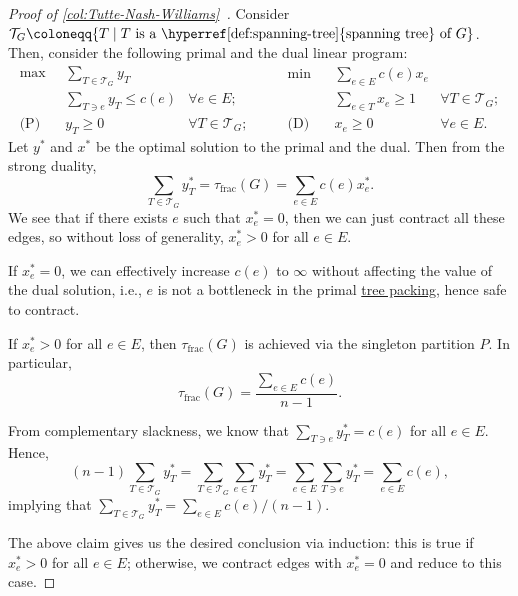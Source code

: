 \begin{proof}[Proof of \autoref{col:Tutte-Nash-Williams}~\cite{chekuri2017near}]\label{pf:col:Tutte-Nash-Williams}
	Consider \(\mathcal{T} _G \coloneqq \{ T \mid T \text{ is a \hyperref[def:spanning-tree]{spanning tree} of } G \} \). Then, consider the following primal and the dual linear program:
	\[
		\begin{aligned}
			\max~           & \sum_{T \in \mathcal{T} _G} y_T                                 \\
			                & \sum_{T \ni e} y_T \leq c(e)    & \forall e \in E;              \\
			\text{(P)}\quad & y_T \geq 0                      & \forall T \in \mathcal{T} _G;
		\end{aligned}\qquad
		\begin{aligned}
			\min~           & \sum_{e \in E} c(e) x_e                                   \\
			                & \sum_{e \in T} x_e \geq 1 & \forall T \in \mathcal{T} _G; \\
			\text{(D)}\quad & x_e \geq 0                & \forall e \in E.
		\end{aligned}
	\]
	Let \(y^{\ast} \) and \(x^{\ast} \) be the optimal solution to the primal and the dual. Then from the strong duality,
	\[
		\sum_{T \in \mathcal{T} _G} y^{\ast} _T
		= \tau _{\text{frac} }(G)
		= \sum_{e \in E} c(e) x^{\ast} _e.
	\]
	We see that if there exists \(e\) such that \(x^{\ast} _e = 0\), then we can just contract all these edges, so without loss of generality, \(x^{\ast} _e > 0\) for all \(e \in E\).

	\begin{intuition}
		If \(x^{\ast} _e = 0\), we can effectively increase \(c(e)\) to \(\infty \) without affecting the value of the dual solution, i.e., \(e\) is not a bottleneck in the primal \hyperref[prb:TP]{tree packing}, hence safe to contract.
	\end{intuition}

	\begin{claim}
		If \(x^{\ast} _e > 0\) for all \(e \in E\), then \(\tau _{\text{frac} }(G)\) is achieved via the singleton partition \(P\). In particular,
		\[
			\tau _{\text{frac} }(G)
			= \frac{\sum_{e \in E} c(e)}{n - 1}.
		\]
	\end{claim}
	\begin{explanation}
		From complementary slackness, we know that \(\sum_{T \ni e} y^{\ast} _T = c(e)\) for all \(e\in E\). Hence,
		\[
			(n-1) \sum_{T \in \mathcal{T} _G} y^{\ast} _T
			= \sum_{T \in \mathcal{T} _G} \sum_{e \in T} y^{\ast} _T
			= \sum_{e \in E} \sum_{T \ni e} y^{\ast} _T
			= \sum_{e \in E} c(e),
		\]
		implying that \(\sum_{T \in \mathcal{T} _G} y^{\ast} _T = \sum_{e\in E} c(e) / (n-1)\).
	\end{explanation}
	The above claim gives us the desired conclusion via induction: this is true if \(x^{\ast} _e >0\) for all \(e\in E\); otherwise, we contract edges with \(x^{\ast} _e = 0\) and reduce to this case.
\end{proof}

